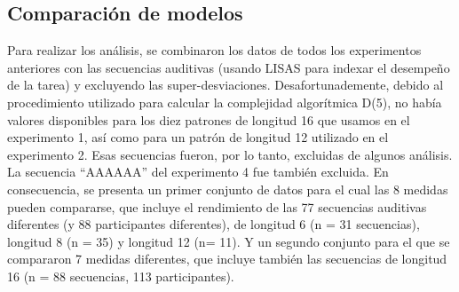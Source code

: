  \subsection{Comparación de modelos}
 
 
 Para realizar los análisis, se combinaron los datos de todos los experimentos anteriores con las secuencias auditivas (usando LISAS para indexar el desempeño de la tarea) y excluyendo las super-desviaciones. Desafortunademente, debido al procedimiento utilizado para calcular la complejidad algorítmica D(5), no había valores disponibles para los diez patrones de longitud 16 que usamos en el experimento 1, así como para un patrón de longitud 12 utilizado en el experimento 2. Esas secuencias fueron, por lo tanto, excluidas de algunos análisis. La secuencia ``AAAAAA'' del experimento 4 fue también excluida. En consecuencia, se presenta un primer conjunto de datos para el cual las 8 medidas pueden compararse, que incluye el rendimiento de las 77 secuencias auditivas diferentes (y 88 participantes diferentes), de longitud 6 (n = 31 secuencias), longitud 8 (n = 35) y longitud 12 (n= 11). Y un segundo conjunto para el que se compararon 7 medidas diferentes, que incluye también las secuencias de longitud 16 (n = 88 secuencias, 113 participantes).
 
